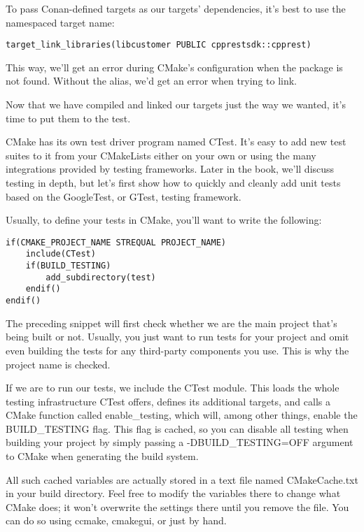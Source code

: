 To pass Conan-defined targets as our targets' dependencies, it's best to use the namespaced target name:

\begin{lstlisting}[style=styleCMake]
target_link_libraries(libcustomer PUBLIC cpprestsdk::cpprest)
\end{lstlisting}

This way, we'll get an error during CMake's configuration when the package is not found. Without the alias, we'd get an error when trying to link.

Now that we have compiled and linked our targets just the way we wanted, it's time to put them to the test.


CMake has its own test driver program named CTest. It's easy to add new test suites to it from your CMakeLists either on your own or using the many integrations provided by testing frameworks. Later in the book, we'll discuss testing in depth, but let's first show how to quickly and cleanly add unit tests based on the GoogleTest, or GTest, testing framework.

Usually, to define your tests in CMake, you'll want to write the following:

\begin{lstlisting}[style=styleCMake]
if(CMAKE_PROJECT_NAME STREQUAL PROJECT_NAME)
	include(CTest)
	if(BUILD_TESTING)
		add_subdirectory(test)
	endif()
endif()
\end{lstlisting}

The preceding snippet will first check whether we are the main project that's being built or not. Usually, you just want to run tests for your project and omit even building the tests for any third-party components you use. This is why the project name is checked.

If we are to run our tests, we include the CTest module. This loads the whole testing infrastructure CTest offers, defines its additional targets, and calls a CMake function called enable\_testing, which will, among other things, enable the BUILD\_TESTING flag. This flag is cached, so you can disable all testing when building your project by simply passing a -DBUILD\_TESTING=OFF argument to CMake when generating the build system.

All such cached variables are actually stored in a text file named CMakeCache.txt in your build directory. Feel free to modify the variables there to change what CMake does; it won't overwrite the settings there until you remove the file. You can do so using ccmake, cmakegui, or just by hand.

